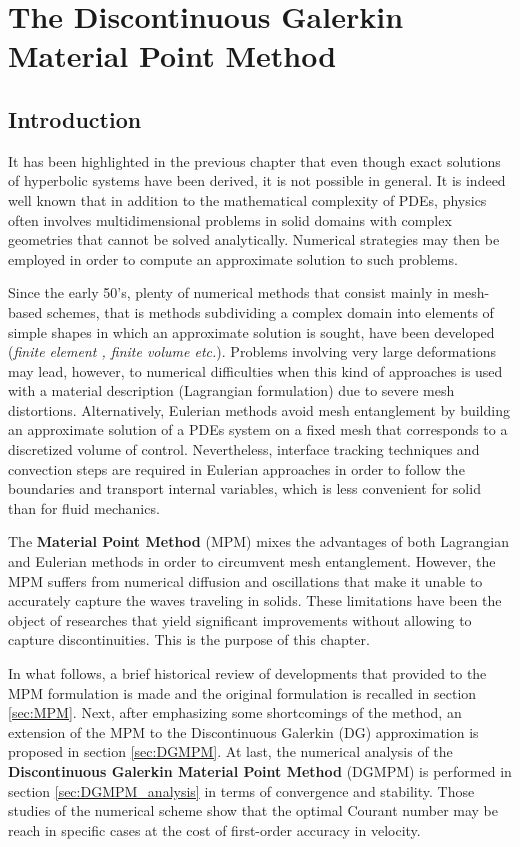 \chapter{The Discontinuous Galerkin Material Point Method}

\section*{Introduction}
It has been highlighted in the previous chapter that even though exact solutions of hyperbolic systems have been derived, it is not possible in general. It is indeed well known that in addition to the mathematical complexity of PDEs, physics often involves multidimensional problems in solid domains with complex geometries that cannot be solved analytically. Numerical strategies may then be employed in order to compute an approximate solution to such problems.

Since the early 50's, plenty of numerical methods that consist mainly in mesh-based schemes, that is methods subdividing a complex domain into elements of simple shapes in which an approximate solution is sought, have been developed (\textit{finite element \cite{Belytschko}, finite volume \cite{Leveque} etc.}). Problems involving very large deformations may lead, however, to numerical difficulties when this kind of approaches is used with a material description (Lagrangian formulation) due to severe mesh distortions. Alternatively, Eulerian methods avoid mesh entanglement by building an approximate solution of a PDEs system on a fixed mesh that corresponds to a discretized volume of control. Nevertheless, interface tracking techniques and convection steps are required in Eulerian approaches in order to follow the boundaries and transport internal variables, which is less convenient for solid than for fluid mechanics.

The \textbf{Material Point Method} (MPM) \cite{Sulsky94} mixes the advantages of both Lagrangian and Eulerian methods in order to circumvent mesh entanglement. However, the MPM suffers from numerical diffusion and oscillations that make it unable to accurately capture the waves traveling in solids. These limitations have been the object of researches that yield significant improvements without allowing to capture discontinuities. This is the purpose of this chapter.

In what follows, a brief historical review of developments that provided to the MPM formulation is made and the original formulation is recalled in section \ref{sec:MPM}. Next, after emphasizing some shortcomings of the method, an extension of the MPM to the Discontinuous Galerkin (DG) approximation is proposed in section \ref{sec:DGMPM}. At last, the numerical analysis of the \textbf{Discontinuous Galerkin Material Point Method} (DGMPM) is performed in section \ref{sec:DGMPM_analysis} in terms of convergence and stability. Those studies of the numerical scheme show that the optimal Courant number may be reach in specific cases at the cost of first-order accuracy in velocity.



